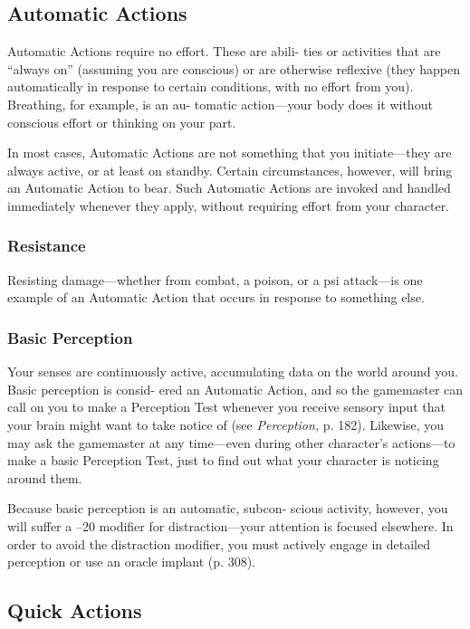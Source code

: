 \subsection{Automatic Actions}

Automatic Actions require no effort. These are abili-
ties or activities that are ``always on'' (assuming you 
are conscious) or are otherwise reflexive (they happen 
automatically in response to certain conditions, with 
no effort from you). Breathing, for example, is an au-
tomatic action—your body does it without conscious 
effort or thinking on your part.

In most cases, Automatic Actions are not something 
that you initiate—they are always active, or at least 
on standby. Certain circumstances, however, will bring 
an Automatic Action to bear. Such Automatic Actions 
are invoked and handled immediately whenever they 
apply, without requiring effort from your character.

\subsubsection{Resistance}

Resisting damage—whether from combat, a poison, or 
a psi attack—is one example of an Automatic Action 
that occurs in response to something else.

\subsubsection{Basic Perception}

Your senses are continuously active, accumulating data 
on the world around you. Basic perception is consid-
ered an Automatic Action, and so the gamemaster can 
call on you to make a Perception Test whenever you 
receive sensory input that your brain might want to 
take notice of (see \textit{Perception,} p. 182). Likewise, you 
may ask the gamemaster at any time—even during 
other character's actions—to make a basic Perception 
Test, just to find out what your character is noticing 
around them.

Because basic perception is an automatic, subcon-
scious activity, however, you will suffer a –20 modifier 
for distraction—your attention is focused elsewhere. 
In order to avoid the distraction modifier, you must 
actively engage in detailed perception or use an oracle 
implant (p. 308).

\subsection{Quick Actions}

